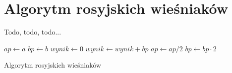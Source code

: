 \section{Algorytm rosyjskich wieśniaków}

Todo, todo, todo...

\begin{algorithm}[h]
  \DontPrintSemicolon
  
  
  \newline
  
  $ap \leftarrow a$\;
  $bp \leftarrow b$\;
  $wynik \leftarrow 0$\;
  {
    {
      $wynik \leftarrow wynik + bp$\;
    }
    $ap \leftarrow ap / 2$\;
    $bp \leftarrow bp \cdot 2$\;
  }
  
  \caption{Algorytm rosyjskich wieśniaków}
  \label{alg-wiesniakow}
\end{algorithm}

